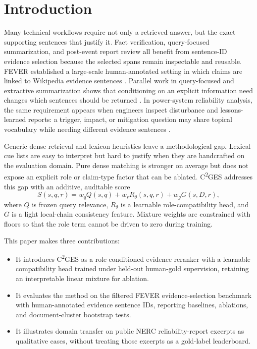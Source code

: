 \documentclass[applsci,article,submit,moreauthors]{Definitions/mdpi}
\newcommand{\cges}{C\textsuperscript{2}GES}
\begin{document}
\section{Introduction}
\label{sec:introduction}

Many technical workflows require not only a retrieved answer, but the exact supporting sentences that justify it. Fact verification, query-focused summarization, and post-event report review all benefit from sentence-ID evidence selection because the selected spans remain inspectable and reusable. FEVER established a large-scale human-annotated setting in which claims are linked to Wikipedia evidence sentences \cite{thorne2018fever}. Parallel work in query-focused and extractive summarization shows that conditioning on an explicit information need changes which sentences should be returned \cite{zhong2021qmsum,zhong2020extractive,vig2022exploring}. In power-system reliability analysis, the same requirement appears when engineers inspect disturbance and lessons-learned reports: a trigger, impact, or mitigation question may share topical vocabulary while needing different evidence sentences \cite{xie2022massively,madabhushi2023survey}.

Generic dense retrieval and lexicon heuristics leave a methodological gap. Lexical cue lists are easy to interpret but hard to justify when they are handcrafted on the evaluation domain. Pure dense matching is stronger on average but does not expose an explicit role or claim-type factor that can be ablated. \cges{} addresses this gap with an additive, auditable score
\begin{equation}
S(s,q,r)=w_q Q(s,q)+w_r R_\theta(s,q,r)+w_g G(s,D,r),
\end{equation}
where $Q$ is frozen query relevance, $R_\theta$ is a learnable role-compatibility head, and $G$ is a light local-chain consistency feature. Mixture weights are constrained with floors so that the role term cannot be driven to zero during training.

This paper makes three contributions:
\begin{itemize}
  \item It introduces \cges{} as a role-conditioned evidence reranker with a learnable compatibility head trained under held-out human-gold supervision, retaining an interpretable linear mixture for ablation.
  \item It evaluates the method on the filtered FEVER evidence-selection benchmark with human-annotated evidence sentence IDs, reporting baselines, ablations, and document-cluster bootstrap tests.
  \item It illustrates domain transfer on public NERC reliability-report excerpts as qualitative cases, without treating those excerpts as a gold-label leaderboard.
\end{itemize}
\end{document}

